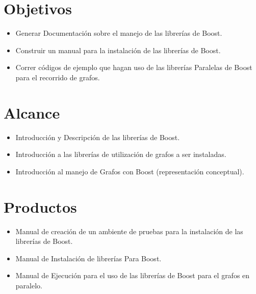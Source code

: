 \section{Objetivos}

	\begin{itemize}
		\item Generar Documentación sobre el manejo de las librerías de Boost.
		\item Construir un manual para la instalación de las librerías de Boost.
		\item Correr códigos de ejemplo que hagan uso de las librerías Paralelas de Boost para el recorrido de grafos.	
	\end{itemize}

\section{Alcance}
	\begin{itemize}
		\item Introducción y Descripción de las librerías de Boost.
		\item Introducción a las librerías de utilización de grafos a ser instaladas.
		\item Introducción al manejo de Grafos con Boost (representación conceptual).
	\end{itemize}

\section{Productos}
	\begin{itemize}
		\item Manual de creación de un ambiente de pruebas para la instalación de las librerías de Boost.
		\item Manual de Instalación de librerías Para Boost.
		\item Manual de Ejecución para el uso de las librerías de Boost para el grafos en paralelo.	
	\end{itemize}

